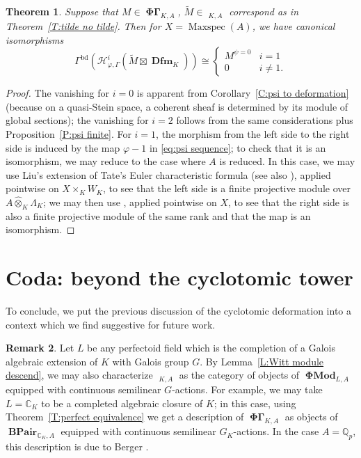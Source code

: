 \documentclass[12pt]{amsart}
\newtheorem{theorem}{Theorem}[section]
\theoremstyle{definition}
\newtheorem{remark}[theorem]{Remark}
\numberwithin{equation}{theorem}
\newcommand{\CC}{\mathbb{C}}
\newcommand{\QQ}{\mathbb{Q}}
\newcommand{\calH}{\mathcal{H}}
\DeclareMathOperator{\bd}{bd}
\DeclareMathOperator{\BPair}{\mathbf{BPair}}
\DeclareMathOperator{\Dfm}{\mathbf{Dfm}}
\DeclareMathOperator{\Maxspec}{Maxspec}
\DeclareMathOperator{\PhiGamma}{\mathbf{\Phi \Gamma}}
\DeclareMathOperator{\PhiGammatilde}{\widetilde{\mathbf{\Phi \Gamma}}}
\DeclareMathOperator{\PhiMod}{\mathbf{\Phi Mod}}
\begin{document}
\begin{theorem} \label{T:psi kernel}
Suppose that $M \in \PhiGamma_{K,A}$,
$\tilde{M} \in \PhiGammatilde_{K,A}$ correspond as in
Theorem~\ref{T:tilde no tilde}.
Then for $X = \Maxspec(A)$,
we have canonical isomorphisms
\[
\Gamma^{\bd}(\calH^i_{\varphi,\Gamma}(\tilde{M} \boxtimes \Dfm_K)) \cong \begin{cases} M^{\psi=0} & i=1 \\ 0 & i \neq 1.
\end{cases}
\]
\end{theorem}
\begin{proof}
The vanishing for $i=0$ is apparent from Corollary~\ref{C:psi to deformation}
(because on a quasi-Stein space, a coherent sheaf is determined by its module of global sections); the vanishing for $i=2$ follows from the same considerations plus 
Proposition~\ref{P:psi finite}. For $i=1$, the morphism from the left side to the right side is induced by the map $\varphi-1$ in \eqref{eq:psi sequence}; to check that it is an isomorphism, we may reduce to the case where $A$ is reduced. In this case, we may
use Liu's extension of Tate's Euler characteristic formula \cite{liu-herr} (see also \cite[Theorem~2.3.11]{kpx}), applied pointwise on $X \times_K W_K$,
to see that the left side is a finite projective module over $A \widehat{\otimes}_K \Lambda_K$; we may then use \cite[Proposition~4.3.8]{kpx}, applied pointwise on $X$, to see that the right side is also a finite projective module of the same rank and that the map is an isomorphism.
\end{proof}

\section{Coda: beyond the cyclotomic tower}
\label{sec:coda}

To conclude, we put the previous discussion of the cyclotomic deformation into a context which we find suggestive for future work.

\begin{remark} \label{R:general field}
Let $L$ be any perfectoid field which is the completion of a Galois algebraic extension of $K$ with Galois group $G$.
By Lemma~\ref{L:Witt module descend}, we may also characterize $\PhiGammatilde_{K,A}$ 
as the category of objects of $\PhiMod_{L,A}$ equipped with continuous semilinear $G$-actions. For example, we may take $L = \CC_K$ to be a completed algebraic closure of $K$;
in this case, using Theorem~\ref{T:perfect equivalence} we get a description of
$\PhiGamma_{K,A}$ as objects of $\BPair_{\CC_K,A}$ equipped with continuous semilinear $G_K$-actions. In the case $A = \QQ_p$, this description is due to Berger \cite{berger-b-pairs}.
\end{remark}
\end{document}
